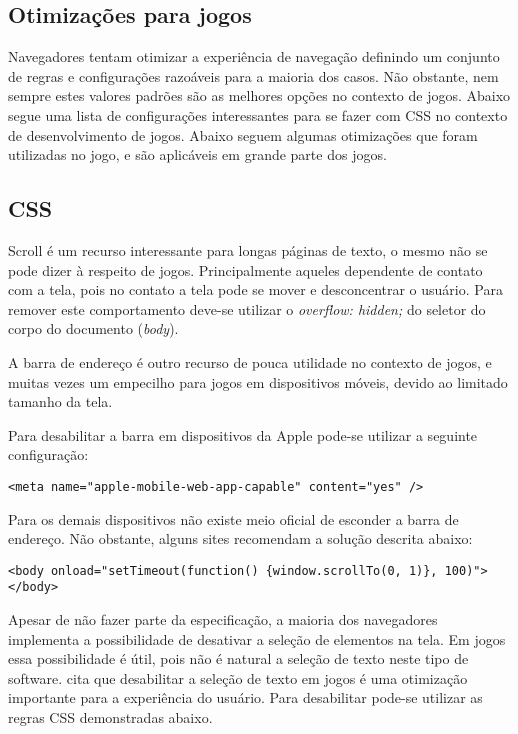 \begin{draft}
\section{Otimizações para jogos}

Navegadores tentam otimizar a experiência de navegação definindo
um conjunto de regras e configurações razoáveis para a maioria dos
casos. Não obstante, nem sempre estes valores padrões são as melhores
opções no contexto de jogos. Abaixo segue uma lista de configurações
interessantes para se fazer com CSS no contexto de desenvolvimento de
jogos.
Abaixo seguem algumas otimizações que foram utilizadas no jogo, e são  aplicáveis 
em grande parte dos jogos.

\subsection{CSS}

Scroll é um recurso interessante para longas páginas de texto,
o mesmo não se pode dizer à respeito de jogos.
Principalmente aqueles dependente de contato com a tela, pois
no contato a tela pode se mover e desconcentrar o usuário. Para
remover este comportamento deve-se utilizar o \textit{overflow:
hidden;} do seletor do corpo do documento (\textit{body}).

A barra de endereço é outro recurso de pouca utilidade no contexto de
jogos, e muitas vezes um empecilho para jogos em dispositivos móveis,
devido ao limitado tamanho da tela.

Para desabilitar a barra em dispositivos da Apple pode-se utilizar a
seguinte configuração:

\begin{verbatim}
<meta name="apple-mobile-web-app-capable" content="yes" />
\end{verbatim}

Para os demais dispositivos não existe meio oficial de esconder a barra
de endereço. Não obstante, alguns sites recomendam a solução descrita abaixo:

\begin{verbatim}
<body onload="setTimeout(function() {window.scrollTo(0, 1)}, 100)">
</body>
\end{verbatim}

Apesar de não fazer parte da especificação, a maioria dos navegadores
implementa a possibilidade de desativar a seleção de elementos na tela.
Em jogos essa possibilidade é útil, pois não é natural a seleção de texto
neste tipo de software. \cite{html5mostwanted} cita que desabilitar
a seleção de texto em jogos é uma otimização importante para a
experiência do usuário. Para desabilitar pode-se utilizar as regras
CSS demonstradas abaixo.


\end{draft}
